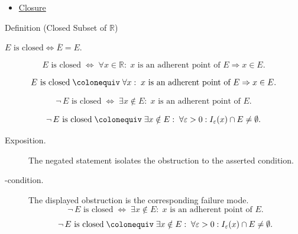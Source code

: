 \begin{dependencies}
\begin{itemize}
  \item \hyperref[def:closure-r]{Closure}
\end{itemize}
\end{dependencies}


\begin{definitionbox}{Definition (Closed Subset of $\mathbb{R}$)}
\begin{definition}
\label{def:closed-set-r}
$E\text{ is closed} \iff \overline{E} = E$.
\end{definition}
\end{definitionbox}

\begin{remark*}
\[
  E\text{ is closed}
  \;\iff\;
  \forall x \in \mathbb{R} :\;
  x\text{ is an adherent point of }E \Rightarrow x \in E.
\]
\end{remark*}

\begin{remark*}
\[
  E\text{ is closed}
  \;\colonequiv\;
  \forall x :\;
  x\text{ is an adherent point of }E \Rightarrow x \in E.
\]
\end{remark*}

\begin{remark*}
\[
  \neg\,E\text{ is closed}
  \;\iff\;
  \exists x \notin E :\; x\text{ is an adherent point of }E.
\]
\end{remark*}

\begin{remark*}
\[
  \neg\,E\text{ is closed}
  \;\colonequiv\;
  \exists x \notin E :\;
  \forall\varepsilon>0 : I_\varepsilon(x)\cap E\neq\emptyset.
\]
\end{remark*}

\begin{remark*}
\begin{description}
  \item[Exposition.]
  The negated statement isolates the obstruction to the asserted condition.

  \item[\exists-condition.]
  The displayed obstruction is the corresponding failure mode.
  \[
  \neg\,E\text{ is closed}
  \;\iff\;
  \exists x \notin E :\; x\text{ is an adherent point of }E.
\]
  \[
  \neg\,E\text{ is closed}
  \;\colonequiv\;
  \exists x \notin E :\;
  \forall\varepsilon>0 : I_\varepsilon(x)\cap E\neq\emptyset.
\]
\end{description}
\end{remark*}



